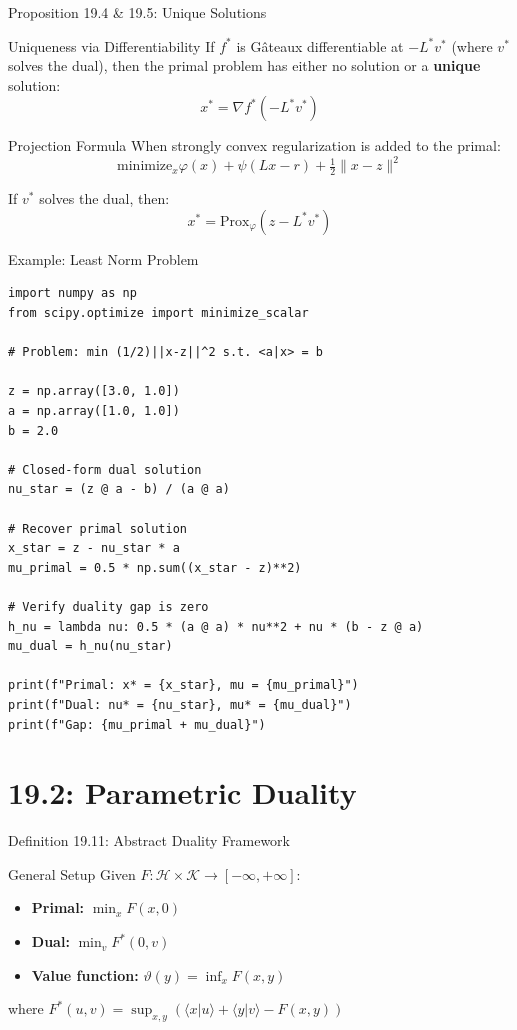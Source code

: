 \documentclass[aspectratio=169,10pt]{beamer}
\begin{document}
\begin{frame}{Proposition 19.4 \& 19.5: Unique Solutions}
    \begin{block}{Uniqueness via Differentiability}
        If $f^*$ is G\^ateaux differentiable at $-L^* v^*$ (where $v^*$ solves the dual), then the primal problem has either no solution or a \textbf{unique} solution:
        $$x^* = \nabla f^*(-L^* v^*)$$
    \end{block}

    \begin{block}{Projection Formula}
        When strongly convex regularization is added to the primal:
        $$\text{minimize}_x \varphi(x) + \psi(Lx - r) + \tfrac{1}{2}\|x - z\|^2$$

        If $v^*$ solves the dual, then:
        $$x^* = \text{Prox}_\varphi(z - L^* v^*)$$
    \end{block}
\end{frame}

\begin{frame}[fragile]{Example: Least Norm Problem}
    \begin{lstlisting}
import numpy as np
from scipy.optimize import minimize_scalar

# Problem: min (1/2)||x-z||^2 s.t. <a|x> = b

z = np.array([3.0, 1.0])
a = np.array([1.0, 1.0])
b = 2.0

# Closed-form dual solution
nu_star = (z @ a - b) / (a @ a)

# Recover primal solution
x_star = z - nu_star * a
mu_primal = 0.5 * np.sum((x_star - z)**2)

# Verify duality gap is zero
h_nu = lambda nu: 0.5 * (a @ a) * nu**2 + nu * (b - z @ a)
mu_dual = h_nu(nu_star)

print(f"Primal: x* = {x_star}, mu = {mu_primal}")
print(f"Dual: nu* = {nu_star}, mu* = {mu_dual}")
print(f"Gap: {mu_primal + mu_dual}")
    \end{lstlisting}
\end{frame}

\section{19.2: Parametric Duality}

\begin{frame}{Definition 19.11: Abstract Duality Framework}
    \begin{block}{General Setup}
        Given $F: \mathcal{H} \times \mathcal{K} \to [-\infty, +\infty]$:
        \begin{itemize}
            \item \textbf{Primal:} $\min_x F(x, 0)$
            \item \textbf{Dual:} $\min_v F^*(0, v)$
            \item \textbf{Value function:} $\vartheta(y) = \inf_x F(x, y)$
        \end{itemize}
    \end{block}

    where $F^*(u, v) = \sup_{x,y} (\langle x | u \rangle + \langle y | v \rangle - F(x, y))$
\end{frame}
\end{document}

